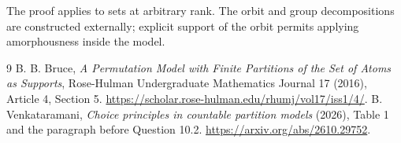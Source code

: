 \documentclass[11pt]{article}
\begin{document}
The proof applies to sets at arbitrary rank. The orbit and group decompositions are constructed externally; explicit support of the orbit permits applying amorphousness inside the model.
\begin{thebibliography}{9}
 B. B. Bruce, \emph{A Permutation Model with Finite Partitions of the Set of Atoms as Supports}, Rose-Hulman Undergraduate Mathematics Journal 17 (2016), Article 4, Section 5. \url{https://scholar.rose-hulman.edu/rhumj/vol17/iss1/4/}.
 B. Venkataramani, \emph{Choice principles in countable partition models} (2026), Table 1 and the paragraph before Question 10.2. \url{https://arxiv.org/abs/2610.29752}.
\end{thebibliography}
\end{document}
